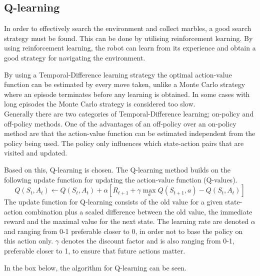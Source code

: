 \documentclass[../Head/Main.tex]{subfiles}
\begin{document}
\subsection{Q-learning}
In order to effectively search the environment and collect marbles, a good search strategy must be found. This can be done by utilising reinforcement learning. By using reinforcement learning, the robot can learn from its experience and obtain a good strategy for navigating the environment.\par
By using a Temporal-Difference learning strategy the optimal action-value function can be estimated by every move taken, unlike a Monte Carlo strategy where an episode terminates before any learning is obtained. In some cases with long episodes the Monte Carlo strategy is considered too slow.\\
Generally there are two categories of Temporal-Difference learning; on-policy and off-policy methods. One of the advantages of an off-policy over an on-policy method are that the action-value function can be estimated independent from the policy being used. The policy only influences which state-action pairs that are visited and updated.\par 
Based on this, Q-learning is chosen. The Q-learning method builds on the following update function for updating the action-value function (Q-values).
\begin{equation}\label{eq:q_update_func}
Q\left(S_t,A_t\right) \leftarrow Q\left(S_t,A_t\right) + \alpha\left[R_{t+1}+\gamma\max_a Q\left(S_{t+1},a\right)-Q\left(S_t,A_t\right)\right]
\end{equation}
The update function for Q-learning consists of the old value for a given state-action combination plus a scaled difference between the old value, the immediate reward and the maximal value for the next state. The learning rate are denoted $\alpha$ and ranging from 0-1 preferable closer to 0, in order not to base the policy on this action only. $\gamma$ denotes the discount factor and is also ranging from 0-1, preferable closer to 1, to ensure that future actions matter.\par
In the box below, the algorithm for Q-learning can be seen.

\end{document}

